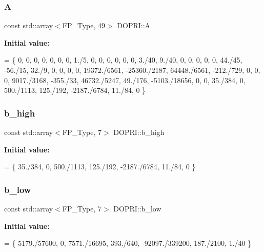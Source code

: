 \subsubsection{\texorpdfstring{A}{A}}
{\footnotesize\ttfamily const std\+::array$<$F\+P\+\_\+\+Type, 49$>$ D\+O\+P\+R\+I\+::A}

{\bfseries Initial value\+:}
\begin{DoxyCode}
= \{
    0,            0,             0,            0,          0,             0,       0,
    1./5,         0,             0,            0,          0,             0,       0,
    3./40,        9./40,         0,            0,          0,             0,       0,
    44./45,       -56./15,       32./9,        0,          0,             0,       0,
    19372./6561,  -25360./2187,  64448./6561,  -212./729,  0,             0,       0,
    9017./3168,   -355./33,      46732./5247,  49./176,    -5103./18656,  0,       0,
    35./384,      0,             500./1113,    125./192,   -2187./6784,   11./84,  0
  \}
\end{DoxyCode}
\mbox{\label{structDOPRI_ac3af90d1e84f3d0ec14ed0247afff8f6}} 
\subsubsection{\texorpdfstring{b\+\_\+high}{b\_high}}
{\footnotesize\ttfamily const std\+::array$<$F\+P\+\_\+\+Type, 7$>$ D\+O\+P\+R\+I\+::b\+\_\+high}

{\bfseries Initial value\+:}
\begin{DoxyCode}
= \{
    35./384, 0, 500./1113, 125./192, -2187./6784, 11./84, 0
  \}
\end{DoxyCode}
\mbox{\label{structDOPRI_a82910ddf39b454e7fcb2bccb35b064d0}} 
\subsubsection{\texorpdfstring{b\+\_\+low}{b\_low}}
{\footnotesize\ttfamily const std\+::array$<$F\+P\+\_\+\+Type, 7$>$ D\+O\+P\+R\+I\+::b\+\_\+low}

{\bfseries Initial value\+:}
\begin{DoxyCode}
= \{
    5179./57600, 0, 7571./16695, 393./640, -92097./339200, 187./2100, 1./40
  \}
\end{DoxyCode}
\mbox{\label{structDOPRI_aee5aa453f5692dbb6b39a5575ab7736f}} 

